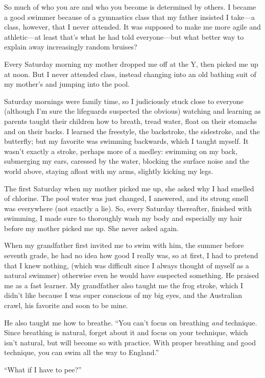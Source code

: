 So much of who you are and who you become is determined by others. I
became a good swimmer because of a gymnastics class that my father
insisted I take---a class, however, that I never attended. It was
supposed to make me more agile and athletic---at least that's what he
had told everyone---but what better way to explain away increasingly
random bruises?

Every Saturday morning my mother dropped me off at the Y, then picked me
up at noon. But I never attended class, instead changing into an old
bathing suit of my mother's and jumping into the pool.

Saturday mornings were family time, so I judiciously stuck close to
everyone (although I'm sure the lifeguards suspected the obvious)
watching and learning as parents taught their children how to breath,
tread water, float on their stomachs and on their backs. I learned the
freestyle, the backstroke, the sidestroke, and the butterfly; but my
favorite was swimming backwards, which I taught myself. It wasn't
exactly a stroke, perhaps more of a medley: swimming on my back,
submerging my ears, caressed by the water, blocking the surface noise
and the world above, staying afloat with my arms, slightly kicking my
legs.

The first Saturday when my mother picked me up, she asked why I had
smelled of chlorine. The pool water was just changed, I answered, and
its strong smell was everywhere (not exactly a lie). So, every Saturday
thereafter, finished with swimming, I made sure to thoroughly wash my
body and especially my hair before my mother picked me up. She never
asked again.

When my grandfather first invited me to swim with him, the summer before
seventh grade, he had no idea how good I really was, so at first, I had
to pretend that I knew nothing, (which was difficult since I always
thought of myself as a natural swimmer) otherwise even he would have
suspected something. He praised me as a fast learner. My grandfather
also taught me the frog stroke, which I didn't like because I was super
conscious of my big eyes, and the Australian crawl, his favorite and
soon to be mine.

He also taught me how to breathe. ``You can't focus on breathing
\emph{and} technique. Since breathing is natural, forget about it and
focus on your technique, which isn't natural, but will become so with
practice. With proper breathing and good technique, you can swim all the
way to England.''

``What if I have to pee?''

